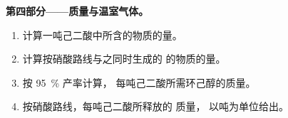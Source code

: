 \begin{problem}
\medskip
\noindent\textbf{第四部分——质量与温室气体。}
\begin{enumerate}[resume]
  \item 计算一吨己二酸中所含的物质的量。
  \item 计算按硝酸路线与之同时生成的  的物质的量。
  \item 按 \qty{95}{\percent} 产率计算，
        每吨己二酸所需环己醇的质量。
  \item 按硝酸路线，每吨己二酸所释放的  质量，
        以吨为单位给出。
\end{enumerate}
\end{problem}
